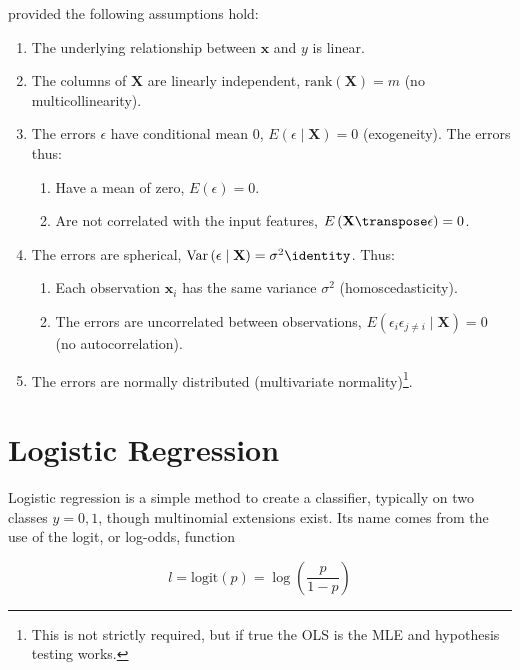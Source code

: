 \noindent provided the following assumptions hold:

\begin{enumerate}[noitemsep]
\item The underlying relationship between $\mathbf{x}$ and $y$ is linear.
\item The columns of $\mathbf{X}$ are linearly independent, \ie $\mathrm{rank}\left(\mathbf{X}\right) = m$ (no multicollinearity).
\item The errors $\epsilon$ have conditional mean 0, $E\left(\epsilon \mid \mathbf{X}\right) = 0$ (exogeneity). The errors thus:
\begin{enumerate}[noitemsep]
\item Have a mean of zero, $E\left(\epsilon\right) = 0$.
\item Are not correlated with the input features, $E\left(\mathbf{X}\transpose\epsilon\right) = 0$.
\end{enumerate}
\item The errors are spherical, $\mathrm{Var}\left(\epsilon \mid \mathbf{X}\right) = \sigma^{2} \identity$. Thus:
\begin{enumerate}[noitemsep]
\item Each observation $\mathbf{x}_{i}$ has the same variance $\sigma^{2}$ (homoscedasticity).
\item The errors are uncorrelated between observations, $E\left(\epsilon_{i}\epsilon_{j \neq i} \mid \mathbf{X}\right) = 0$ (no autocorrelation).
\end{enumerate}
\item The errors are normally distributed (multivariate normality)\footnote{This is not strictly required, but if true the OLS is the MLE and hypothesis testing works.}.
\end{enumerate}


\section{Logistic Regression}
\label{regression:logistic}

Logistic regression is a simple method to create a classifier,
typically on two classes $y = 0,1$, though multinomial extensions exist.
Its name comes from the use of the logit, or log-odds, function

\begin{equation}\label{eq:logistic:logic}
l = \text{logit}\left(p\right) = \log\left(\frac{p}{1-p}\right)
\end{equation}

